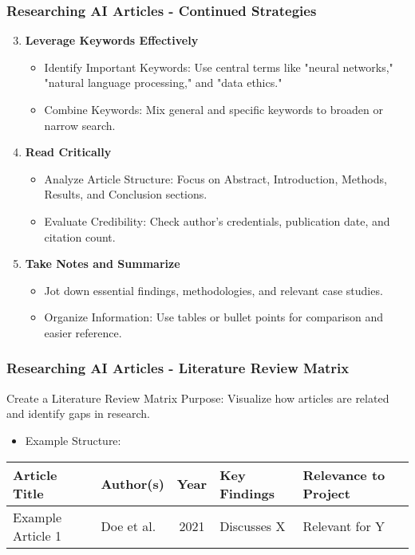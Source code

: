 \documentclass{beamer}
\begin{document}
\begin{frame}[fragile]
    \frametitle{Researching AI Articles - Continued Strategies}
    \begin{enumerate}
        \setcounter{enumi}{2} %
        \item \textbf{Leverage Keywords Effectively}
        \begin{itemize}
            \item Identify Important Keywords: Use central terms like "neural networks," "natural language processing," and "data ethics."
            \item Combine Keywords: Mix general and specific keywords to broaden or narrow search.
        \end{itemize}

        \item \textbf{Read Critically}
        \begin{itemize}
            \item Analyze Article Structure: Focus on Abstract, Introduction, Methods, Results, and Conclusion sections.
            \item Evaluate Credibility: Check author's credentials, publication date, and citation count.
        \end{itemize}

        \item \textbf{Take Notes and Summarize}
        \begin{itemize}
            \item Jot down essential findings, methodologies, and relevant case studies.
            \item Organize Information: Use tables or bullet points for comparison and easier reference.
        \end{itemize}
    \end{enumerate}
\end{frame}

\begin{frame}[fragile]
    \frametitle{Researching AI Articles - Literature Review Matrix}
    \begin{block}{Create a Literature Review Matrix}
        Purpose: Visualize how articles are related and identify gaps in research.
        \begin{itemize}
            \item Example Structure:
            \end{itemize}
            \begin{center}
            \begin{tabular}{|l|l|c|l|l|}
                \hline
                Article Title & Author(s) & Year & Key Findings & Relevance to Project \\
                \hline
                Example Article 1 & Doe et al. & 2021 & Discusses X & Relevant for Y \\
                \hline
            \end{tabular}
            \end{center}
    \end{block}
\end{frame}
\end{document}

